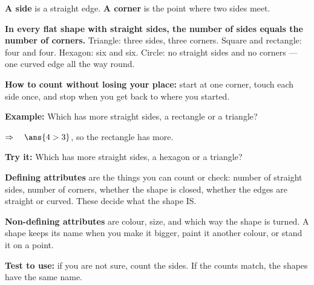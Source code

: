 \documentclass[12pt]{article}
\begin{document}


\begin{formulabox}
\textbf{A side} is a straight edge. \textbf{A corner} is the point where two sides meet.\par
\textbf{In every flat shape with straight sides, the number of sides equals the number of corners.}
Triangle: three sides, three corners. Square and rectangle: four and four. Hexagon: six and six. Circle: no straight sides and no corners --- one curved edge all the way round.\par
\textbf{How to count without losing your place:} start at one corner, touch each side once, and stop when you get back to where you started.
\end{formulabox}

\begin{examplebox}
\textbf{Example:} \quad Which has more straight sides, a rectangle or a triangle?

$\Rightarrow\quad \ans{4 > 3}$, so the rectangle has more.
\end{examplebox}

\begin{tryitbox}
\textbf{Try it:} \quad Which has more straight sides, a hexagon or a triangle?\\[2pt]
\end{tryitbox}


\begin{formulabox}
\textbf{Defining attributes} are the things you can count or check: number of straight sides, number of corners, whether the shape is closed, whether the edges are straight or curved. These decide what the shape IS.\par
\textbf{Non-defining attributes} are colour, size, and which way the shape is turned. A shape keeps its name when you make it bigger, paint it another colour, or stand it on a point.\par
\textbf{Test to use:} if you are not sure, count the sides. If the counts match, the shapes have the same name.
\end{formulabox}
\end{document}
